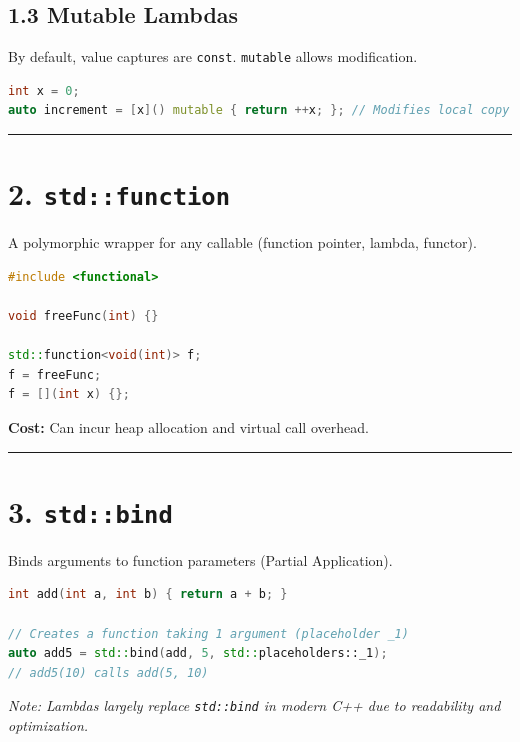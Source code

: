\hypertarget{mutable-lambdas}{%
\subsection{1.3 Mutable Lambdas}\label{mutable-lambdas}}

By default, value captures are \passthrough{\lstinline!const!}.
\passthrough{\lstinline!mutable!} allows modification.

\begin{lstlisting}[language={C++}]
int x = 0;
auto increment = [x]() mutable { return ++x; }; // Modifies local copy
\end{lstlisting}

\begin{center}\rule{0.5\linewidth}{0.5pt}\end{center}

\hypertarget{stdfunction}{%
\section{\texorpdfstring{2.
\texttt{std::function}}{2. std::function}}\label{stdfunction}}

A polymorphic wrapper for any callable (function pointer, lambda,
functor).

\begin{lstlisting}[language={C++}]
#include <functional>

void freeFunc(int) {}

std::function<void(int)> f;
f = freeFunc;
f = [](int x) {}; 
\end{lstlisting}

\textbf{Cost:} Can incur heap allocation and virtual call overhead.

\begin{center}\rule{0.5\linewidth}{0.5pt}\end{center}

\hypertarget{stdbind}{%
\section{\texorpdfstring{3.
\texttt{std::bind}}{3. std::bind}}\label{stdbind}}

Binds arguments to function parameters (Partial Application).

\begin{lstlisting}[language={C++}]
int add(int a, int b) { return a + b; }

// Creates a function taking 1 argument (placeholder _1)
auto add5 = std::bind(add, 5, std::placeholders::_1); 
// add5(10) calls add(5, 10)
\end{lstlisting}

\emph{Note: Lambdas largely replace \passthrough{\lstinline!std::bind!}
in modern C++ due to readability and optimization.}
